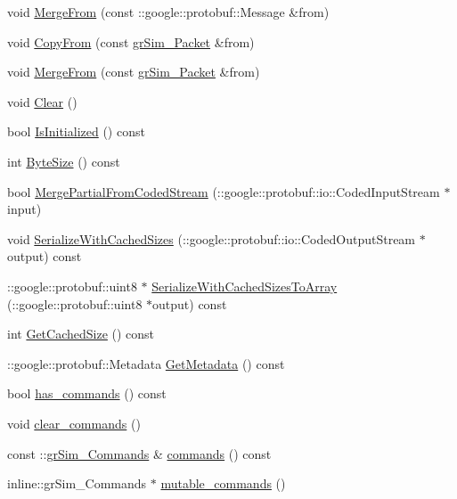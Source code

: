 \begin{DoxyCompactItemize}
\item 
void \hyperlink{classgr_sim___packet_ad12d1b57fb51b8f2076dd3b2fb5c806f}{Merge\-From} (const \-::google\-::protobuf\-::\-Message \&from)
\item 
void \hyperlink{classgr_sim___packet_a574b78df1bf851924480c47b6b3bd670}{Copy\-From} (const \hyperlink{classgr_sim___packet}{gr\-Sim\-\_\-\-Packet} \&from)
\item 
void \hyperlink{classgr_sim___packet_afea6fd2ec641810f732f20dfdfb610dd}{Merge\-From} (const \hyperlink{classgr_sim___packet}{gr\-Sim\-\_\-\-Packet} \&from)
\item 
void \hyperlink{classgr_sim___packet_aba4aa2666affb0f00052ff7c0f73b80a}{Clear} ()
\item 
bool \hyperlink{classgr_sim___packet_a672c2478ce27b408b5a58637ccb48b35}{Is\-Initialized} () const 
\item 
int \hyperlink{classgr_sim___packet_a7f45ce1519005beceafbd29130831ca7}{Byte\-Size} () const 
\item 
bool \hyperlink{classgr_sim___packet_a1746231d8225e8958f68125f6931543a}{Merge\-Partial\-From\-Coded\-Stream} (\-::google\-::protobuf\-::io\-::\-Coded\-Input\-Stream $\ast$input)
\item 
void \hyperlink{classgr_sim___packet_a2337a390650cac64173b9e30f97f6ae2}{Serialize\-With\-Cached\-Sizes} (\-::google\-::protobuf\-::io\-::\-Coded\-Output\-Stream $\ast$output) const 
\item 
\-::google\-::protobuf\-::uint8 $\ast$ \hyperlink{classgr_sim___packet_aa62c56f2e5b76d3e4f1abb14c7f53d73}{Serialize\-With\-Cached\-Sizes\-To\-Array} (\-::google\-::protobuf\-::uint8 $\ast$output) const 
\item 
int \hyperlink{classgr_sim___packet_a30be2546f94579a30c6fedf831d7ab5f}{Get\-Cached\-Size} () const 
\item 
\-::google\-::protobuf\-::\-Metadata \hyperlink{classgr_sim___packet_acb4b8f2940f7fbde34838934b4b9cf80}{Get\-Metadata} () const 
\item 
bool \hyperlink{classgr_sim___packet_a1d8ff8109c642a1faab29a6fc4b6bb53}{has\-\_\-commands} () const 
\item 
void \hyperlink{classgr_sim___packet_a7eeb36d110e9e7ffeb8931b2f465a273}{clear\-\_\-commands} ()
\item 
const \-::\hyperlink{classgr_sim___commands}{gr\-Sim\-\_\-\-Commands} \& \hyperlink{classgr_sim___packet_a3198505f4a5ef2d22038efee9331a760}{commands} () const 
\item 
inline\-::gr\-Sim\-\_\-\-Commands $\ast$ \hyperlink{classgr_sim___packet_adefd4fb7b1b41f5ec8bc62901b4e8c1a}{mutable\-\_\-commands} ()

\end{DoxyCompactItemize}
